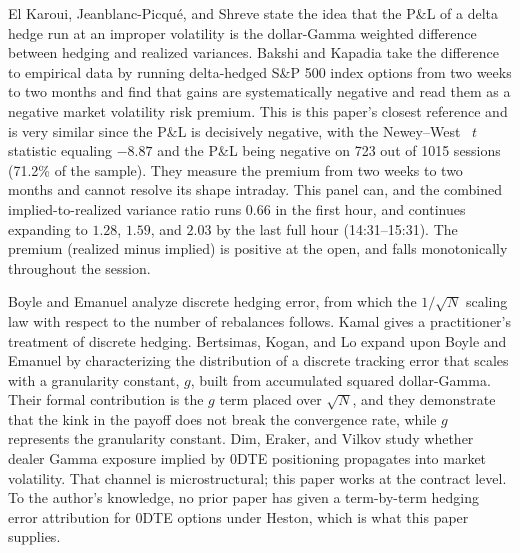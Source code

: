 \documentclass[11pt]{article}
\begin{document}
El Karoui, Jeanblanc-Picqu\'e, and Shreve \cite{elkaroui1998} state the idea that the P\&L of a delta hedge run at an improper volatility is
the dollar-Gamma weighted difference between hedging and realized variances. Bakshi and Kapadia \cite{bakshi2003} take the difference to empirical data by running
delta-hedged S\&P 500 index options from two weeks to two months and find that gains are systematically negative and read them as a negative market volatility risk premium.
This is this paper's closest reference and is very similar since the P\&L is decisively negative, with the Newey--West~\cite{neweywest1987} $t$ statistic equaling $-8.87$ and the P\&L being
negative on 723 out of 1015 sessions (71.2\% of the sample). They measure the premium from two weeks to two months and cannot resolve its shape
intraday. This panel can, and the combined implied-to-realized variance ratio runs $0.66$ in the first hour, and continues expanding to $1.28$, $1.59$, and $2.03$ by
the last full hour (14:31--15:31). The premium (realized minus implied) is positive at the open, and falls monotonically throughout the session.

Boyle and Emanuel \cite{boyleemanuel1980} analyze discrete hedging error, from which the $1/\sqrt{N}$ scaling law with respect to the number of rebalances follows.
Kamal \cite{kamal1999} gives a practitioner's treatment of discrete hedging.
Bertsimas, Kogan, and Lo \cite{bertsimas2000} expand upon Boyle and Emanuel by characterizing the distribution of a discrete tracking error that scales with a granularity constant, $g$, built from accumulated squared dollar-Gamma.
Their formal contribution is the $g$ term placed over $\sqrt{N}$, and they demonstrate that the kink in the payoff does not break the convergence rate, while $g$ represents the granularity constant.
Dim, Eraker, and Vilkov \cite{dimeraker2023} study whether dealer Gamma exposure implied by 0DTE positioning propagates into market volatility.
That channel is microstructural; this paper works at the contract level.
To the author's knowledge, no prior paper has given a term-by-term hedging error attribution for 0DTE options under Heston, which is what this paper supplies.
\end{document}
